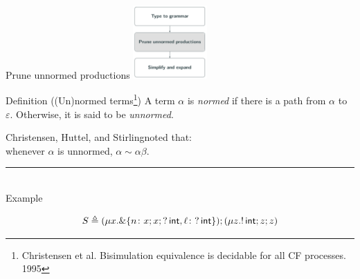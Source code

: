 \documentclass[10pt]{beamer}
\begin{document}
\begin{frame} {Prune unnormed productions}
	\hfill\includegraphics[height=2.8cm]{img/prune.png}

	\vspace*{-3.2cm}
	\begin{varblock}[7.8cm]{Definition ((Un)normed terms\footnote{\label{note1} Christensen et al. Bisimulation equivalence is decidable for all CF processes. 1995})}
		\smallskip 
		A term $\alpha$ is \emph{normed} if there is a path from $\alpha$ to $\varepsilon$. Otherwise, it is said to be \emph{unnormed}.
	\end{varblock}

	Christensen, Huttel, and Stirling\footnotemark[\value{footnote}] noted that:\\\smallskip
	\hspace*{1cm}	whenever $\alpha$ is unnormed, $\alpha \sim \alpha \beta$.

	\pause
	\vspace*{-1mm}
	{\color{teal}\rule{3cm}{2pt}}\\
   	{\color{teal} Example} \\\smallskip
	\vspace*{-7mm}

	$$S \triangleq (\mu x. \&\{n\colon x;x;?\,\mathsf{int},
      \ell\colon ?\,\mathsf{int} \});( \mu z. !\,\mathsf{int}; z;z )$$


\end{frame}
\end{document}
